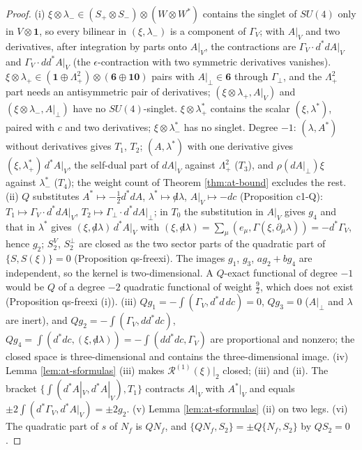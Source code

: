 \documentclass[11pt]{article}
\numberwithin{equation}{section}
\theoremstyle{plain}
\theoremstyle{definition}
\newcommand{\Ap}{A|_{\perp}}
\newcommand{\AV}{A|_V}
\newcommand{\dslash}{{\not d}}
\begin{document}
\begin{proof}
(i) $\xi\otimes\lambda_-\in(S_+\otimes S_-)\otimes(W\otimes W^*)$ contains the singlet of $SU(4)$ only in $V\otimes\mathbf 1$, so every bilinear in $(\xi,\lambda_-)$ is a component of $\Gamma_V$; with $\AV$ and two derivatives, after integration by parts onto $\AV$, the contractions are $\Gamma_V\cdot d^*d\AV$ and $\Gamma_V\cdot dd^*\AV$ (the $\epsilon$-contraction with two symmetric derivatives vanishes). $\xi\otimes\lambda_+\in(\mathbf 1\oplus\Lambda^2_+)\otimes(\mathbf 6\oplus\mathbf{10})$ pairs with $\Ap\in\mathbf 6$ through $\Gamma_\perp$, and the $\Lambda^2_+$ part needs an antisymmetric pair of derivatives; $(\xi\otimes\lambda_+,\AV)$ and $(\xi\otimes\lambda_-,\Ap)$ have no $SU(4)$-singlet. $\xi\otimes\lambda^*_+$ contains the scalar $(\xi,\lambda^*)$, paired with $c$ and two derivatives; $\xi\otimes\lambda^*_-$ has no singlet. Degree $-1$: $(\lambda,A^*)$ without derivatives gives $T_1$, $T_2$; $(A,\lambda^*)$ with one derivative gives $(\xi,\lambda^*_+)\,d^*\AV$, the self-dual part of $d\AV$ against $\Lambda^2_+$ ($T_3$), and $\rho(d\Ap)\xi$ against $\lambda^*_-$ ($T_4$); the weight count of Theorem \ref{thm:at-bound} excludes the rest. (ii) $Q$ substitutes $A^*\mapsto-\tfrac12d^*dA$, $\lambda^*\mapsto\dslash\lambda$, $\AV\mapsto-dc$ (Proposition c1-Q): $T_1\mapsto\Gamma_V\cdot d^*d\AV$, $T_2\mapsto\Gamma_\perp\cdot d^*d\Ap$; in $T_0$ the substitution in $\AV$ gives $g_4$ and that in $\lambda^*$ gives $(\xi,\dslash\lambda)\,d^*\AV$ with $(\xi,\dslash\lambda)=\sum_\mu(e_\mu,\Gamma(\xi,\partial_\mu\lambda))=-d^*\Gamma_V$, hence $g_2$; $S^V_2$, $S^\perp_2$ are closed as the two sector parts of the quadratic part of $\{S,S(\xi)\}=0$ (Proposition qs-freexi). The images $g_1$, $g_3$, $ag_2+bg_4$ are independent, so the kernel is two-dimensional. A $Q$-exact functional of degree $-1$ would be $Q$ of a degree $-2$ quadratic functional of weight $\tfrac92$, which does not exist (Proposition qs-freexi (i)). (iii) $Qg_1=-\int(\Gamma_V,d^*d\,dc)=0$, $Qg_3=0$ ($\Ap$ and $\lambda$ are inert), and $Qg_2=-\int(\Gamma_V,dd^*dc)$, $Qg_4=\int(d^*dc,(\xi,\dslash\lambda))=-\int(dd^*dc,\Gamma_V)$ are proportional and nonzero; the closed space is three-dimensional and contains the three-dimensional image. (iv) Lemma \ref{lem:at-sformulas} (iii) makes $\mathcal R^{(1)}(\xi)|_2$ closed; (iii) and (ii). The bracket $\{\int(d^*\AV,d^*\AV),T_1\}$ contracts $\AV$ with $A^*|_V$ and equals $\pm2\int(d^*\Gamma_V,d^*\AV)=\pm2g_2$. (v) Lemma \ref{lem:at-sformulas} (ii) on two legs. (vi) The quadratic part of $s$ of $N_f$ is $QN_f$, and $\{QN_f,S_2\}=\pm Q\{N_f,S_2\}$ by $QS_2=0$.
\end{proof}
\end{document}
